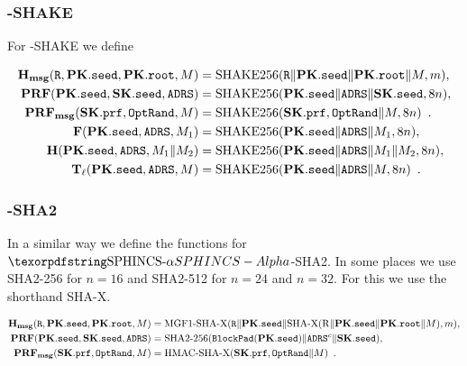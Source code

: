 \begin{table}[ht]
    \caption{Example parameter sets for \SPHINCSA\ targeting different security levels and different tradeoffs between size and speed. Note that these parameter sets have been update for round 3. The column labeled ``bitsec'' gives the bit security computed as described in Section 9; the column labeled ``sec level'' gives the security level according to the levels specified in Section 4. $\mathrm{A}.5$ of the Call for Proposals. As explained later,
    for Haraka the security level is limited to 2: i.e., it is 1 for $n=16$, and 2 for $n=24$ or $n=32.$}
\end{table}

\subsubsection{\SPHINCSA-SHAKE}

For \SPHINCSA-SHAKE we define

\begin{align*}
    \mathbf{H_{msg}} (\mathtt{R}, \mathbf{PK}.\mathtt{seed}, \mathbf{PK}.\mathtt{root}, M)
        &=\text{SHAKE256}(\mathtt{R} \| \mathbf{PK}.\mathtt{seed} \| \mathbf{PK}.\mathtt{root} \| M, m), \\
    \mathbf{PRF}(\mathbf{PK}.\mathtt{seed}, \mathbf{SK}.\mathtt{seed}, \mathtt{ADRS}) &= \text{SHAKE256}(\mathbf{PK}.\mathtt{seed} \| \mathtt{ADRS} \| \mathbf{SK}.\mathtt{seed},8n), \\
    \mathbf{PRF_{msg}}(\mathbf{SK}.\mathtt{prf}, \mathtt{OptRand}, M) &= \text{SHAKE256}(\mathbf{SK}.\mathtt{prf}, \mathtt{OptRand} \| M,8n) \enspace. \\
    \mathbf{F}(\mathbf{PK}.\mathtt{seed}, \mathtt{ADRS}, M_1) &= \text{SHAKE256}(\mathbf{PK}.\mathtt{seed} \| \mathtt{ADRS} \| M_{1},8n ), \\
    \mathbf{H}(\mathbf{PK}.\mathtt{seed}, \mathtt{ADRS}, M_1 \| M_2) &= \text{SHAKE256}(\mathbf{PK}.\mathtt{seed} \| \mathtt{ADRS} \| M_1 \| M_2,8n ), \\
    \mathbf{T}_\ell (\mathbf{PK}.\mathtt{seed}, \mathtt{ADRS}, M) &= \text{SHAKE256}(\mathbf{PK}.\mathtt{seed} \| \mathtt{ADRS} \| M,8n) \enspace.
\end{align*}

 

\subsubsection{\SPHINCSA-SHA2}

In a similar way we define the functions for $\SPHINCSA$-SHA2. In some places we use SHA2-256 for $n=16$ and SHA2-512 for $n=24$ and $n=32$. For this we use the shorthand SHA-X.

\begin{align*}
    \mathbf{H_{msg}} (\mathtt{R}, \mathbf{PK}.\mathtt{seed}, \mathbf{PK}.\mathtt{root}, M)
        &=\text{MGF1-SHA-X}(\mathtt{R} \| \mathbf{PK}.\mathtt{seed} \| \text{SHA-X} (\mathrm{R}\|\mathbf{PK}.\mathtt{seed}\|\mathbf{PK}.\mathtt{root} \| M), m), \\
    \mathbf{PRF}(\mathbf{PK}.\mathtt{seed}, \mathbf{SK}.\mathtt{seed}, \mathtt{ADRS}) &= \text{SHA2-256}(\mathtt{BlockPad}(\mathbf{PK}.\mathtt{seed}) \| \mathtt{ADRS}^c \| \mathbf{SK}.\mathtt{seed}), \\
    \mathbf{PRF_{msg}}(\mathbf{SK}.\mathtt{prf}, \mathtt{OptRand}, M) &= \text{HMAC-SHA-X}(\mathbf{SK}.\mathtt{prf}, \mathtt{OptRand} \| M) \enspace.
\end{align*}

